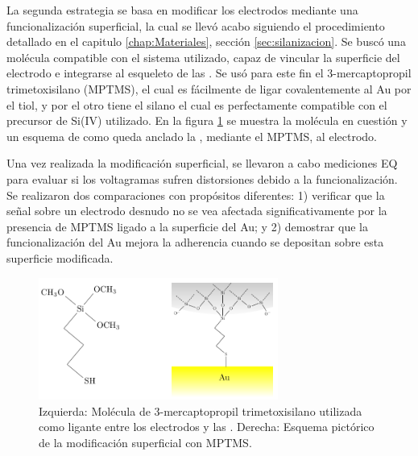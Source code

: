 					
			 La segunda estrategia se basa en modificar los electrodos mediante una funcionalización superficial, la cual se llevó acabo siguiendo el procedimiento detallado en el capitulo \ref{chap:Materiales}, sección \ref{sec:silanizacion}. Se buscó una molécula compatible con el sistema utilizado, capaz de vincular la superficie del electrodo e integrarse al esqueleto de las \pdm. Se usó para este fin el 3-mercaptopropil trimetoxisilano (MPTMS), el cual es fácilmente de ligar covalentemente al Au por el tiol\cite{Gosser,Byun2013}, y por el otro tiene el silano el cual es perfectamente compatible con el precursor de Si(IV) utilizado\cite{Wu2014,Wu2013,Chen2011}. En la figura \ref{fig:mod_sup} se muestra la molécula en cuestión y un esquema de como queda anclado la \pdm, mediante el MPTMS, al electrodo.
		
			 Una vez realizada la modificación superficial, se llevaron a cabo mediciones EQ para evaluar si los voltagramas sufren distorsiones debido a la funcionalización. Se realizaron dos comparaciones con propósitos diferentes: 1) verificar que la señal sobre un electrodo desnudo no se vea afectada significativamente por la presencia de MPTMS ligado a la superficie del Au; y 2) demostrar que la funcionalización del Au mejora la adherencia cuando se depositan \pdm\space sobre esta superficie modificada.

			 \begin{figure}[!ht]
							\begin{center}
							\includegraphics[width=0.70\textwidth]{Esquemas/mod_sup.pdf}
							\caption[Modificación superficial de los electrodos.]{Izquierda: Molécula de  3-mercaptopropil trimetoxisilano utilizada como ligante entre los electrodos y las \pdm. Derecha: Esquema pictórico de la modificación superficial con MPTMS.}
							\label{fig:mod_sup}
							\end{center}
							\end{figure}
			 \pagebreak
							
